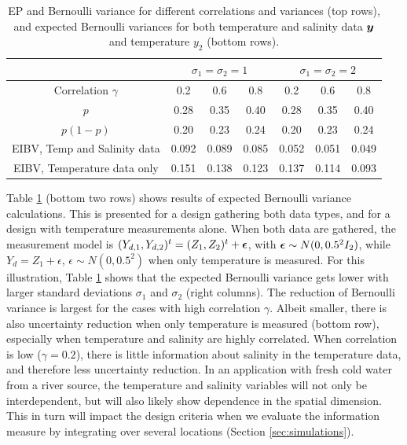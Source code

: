 \documentclass[aoas]{imsart}
\begin{document}
\begin{table}[!h] \centering \caption{EP and Bernoulli variance for
    different correlations and variances (top rows), and expected
    Bernoulli variances for both temperature and salinity data ${\boldsymbol y}$ and 
    temperature $y_2$ (bottom rows).}
  \begin{tabular}{c|ccc|ccc}
 &\multicolumn{3}{c}{$\sigma_1=\sigma_2=1$} & \multicolumn{3}{c}{$\sigma_1=\sigma_2=2$} \\
\hline
Correlation $\gamma$ & 0.2 & 0.6 & 0.8 & 0.2 & 0.6 & 0.8 \\
\hline
$p$ & 0.28 & 0.35 & 0.40 & 0.28 & 0.35 & 0.40 \\ 
$p(1-p)$ & 0.20 & 0.23 & 0.24 & 0.20 & 0.23 & 0.24 \\ 
EIBV, Temp and Salinity data & 0.092 & 0.089 & 0.085 & 0.052 & 0.051 & 0.049 \\ 
EIBV, Temperature data only & 0.151 & 0.138 & 0.123 & 0.137 & 0.114 & 0.093 \\ 
\hline
\end{tabular}
\label{tab:sim_rhoab}
\end{table}

Table \ref{tab:sim_rhoab} (bottom two rows) shows results of expected
Bernoulli variance calculations. This is presented for a design
gathering both data types, and for a design with temperature
measurements alone. When both data are gathered, the measurement model is
$(Y_{d,1},Y_{d,2})^t=(Z_1,Z_2)^t+{\boldsymbol \epsilon}$, with ${\boldsymbol \epsilon} \sim N(0,0.5^2I_2)$, while $Y_d=Z_1+\epsilon$, $\epsilon \sim N(0,0.5^2)$ when only temperature is measured.
For this illustration, Table \ref{tab:sim_rhoab} shows that the
expected Bernoulli variance gets lower with larger standard deviations
$\sigma_1$ and $\sigma_2$ (right columns). The reduction of Bernoulli
variance is largest for the cases with high correlation
$\gamma$. Albeit smaller, there is also uncertainty reduction when
only temperature is measured (bottom row), especially when temperature
and salinity are highly correlated. When correlation is low
($\gamma=0.2$), there is little information about salinity in the
temperature data, and therefore less uncertainty reduction. In an
application with fresh cold water from a river source, the temperature
and salinity variables will not only be interdependent, but will also
likely show dependence in the spatial dimension. This in turn will
impact the design criteria when we evaluate the information measure by
integrating over several locations (Section \ref{sec:simulations}).
\end{document}
